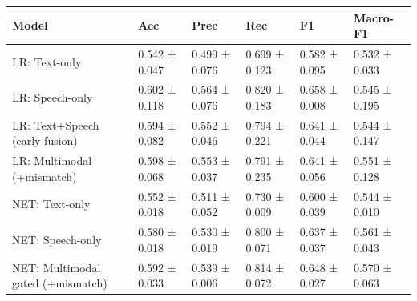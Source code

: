 \begin{tabular}{llllll}
\toprule
Model & Acc & Prec & Rec & F1 & Macro-F1 \\
\midrule
LR: Text-only & 0.542 ± 0.047 & 0.499 ± 0.076 & 0.699 ± 0.123 & 0.582 ± 0.095 & 0.532 ± 0.033 \\
LR: Speech-only & 0.602 ± 0.118 & 0.564 ± 0.076 & 0.820 ± 0.183 & 0.658 ± 0.008 & 0.545 ± 0.195 \\
LR: Text+Speech (early fusion) & 0.594 ± 0.082 & 0.552 ± 0.046 & 0.794 ± 0.221 & 0.641 ± 0.044 & 0.544 ± 0.147 \\
LR: Multimodal (+mismatch) & 0.598 ± 0.068 & 0.553 ± 0.037 & 0.791 ± 0.235 & 0.641 ± 0.056 & 0.551 ± 0.128 \\
NET: Text-only & 0.552 ± 0.018 & 0.511 ± 0.052 & 0.730 ± 0.009 & 0.600 ± 0.039 & 0.544 ± 0.010 \\
NET: Speech-only & 0.580 ± 0.018 & 0.530 ± 0.019 & 0.800 ± 0.071 & 0.637 ± 0.037 & 0.561 ± 0.043 \\
NET: Multimodal gated (+mismatch) & 0.592 ± 0.033 & 0.539 ± 0.006 & 0.814 ± 0.072 & 0.648 ± 0.027 & 0.570 ± 0.063 \\
\bottomrule
\end{tabular}
